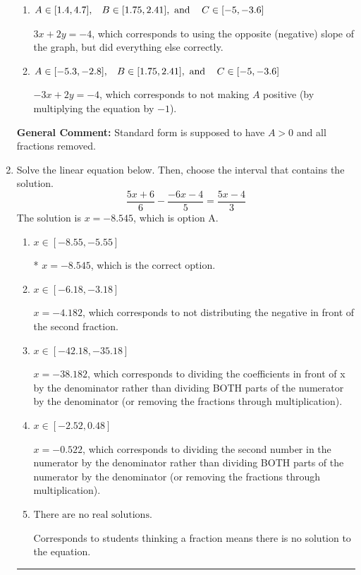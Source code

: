 \documentclass{extbook}[14pt]
\newcommand{\litem}[1]{\item #1

\rule{\textwidth}{0.4pt}}
\begin{document}
\begin{enumerate}
{\begin{enumerate}[label=\Alph*.]
 $-1.5x + 1y = -2.0$, which corresponds to not removing rational values for Standard Form.
\item \( A \in [1.4, 4.7], \hspace{3mm} B \in [1.75, 2.41], \text{ and } \hspace{3mm} C \in [-5, -3.6] \)

 $3x + 2y = -4$, which corresponds to using the opposite (negative) slope of the graph, but did everything else correctly.
\item \( A \in [-5.3, -2.8], \hspace{3mm} B \in [1.75, 2.41], \text{ and } \hspace{3mm} C \in [-5, -3.6] \)

 $-3x + 2y = -4$, which corresponds to not making $A$ positive (by multiplying the equation by $-1$).
\end{enumerate}

\textbf{General Comment:} Standard form is supposed to have $A > 0$ and all fractions removed.
}
\litem{
Solve the linear equation below. Then, choose the interval that contains the solution.
\[ \frac{5x + 6}{6} - \frac{-6x -4}{5} = \frac{5x -4}{3} \]The solution is \( x = -8.545 \), which is option A.\begin{enumerate}[label=\Alph*.]
\item \( x \in [-8.55, -5.55] \)

* $x = -8.545$, which is the correct option.
\item \( x \in [-6.18, -3.18] \)

 $x = -4.182$, which corresponds to not distributing the negative in front of the second fraction.
\item \( x \in [-42.18, -35.18] \)

 $x = -38.182$, which corresponds to dividing the coefficients in front of x by the denominator rather than dividing BOTH parts of the numerator by the denominator (or removing the fractions through multiplication).
\item \( x \in [-2.52, 0.48] \)

 $x = -0.522$, which corresponds to dividing the second number in the numerator by the denominator rather than dividing BOTH parts of the numerator by the denominator (or removing the fractions through multiplication).
\item \( \text{There are no real solutions.} \)

Corresponds to students thinking a fraction means there is no solution to the equation.
\end{enumerate}

}
\end{enumerate}
\end{document}
